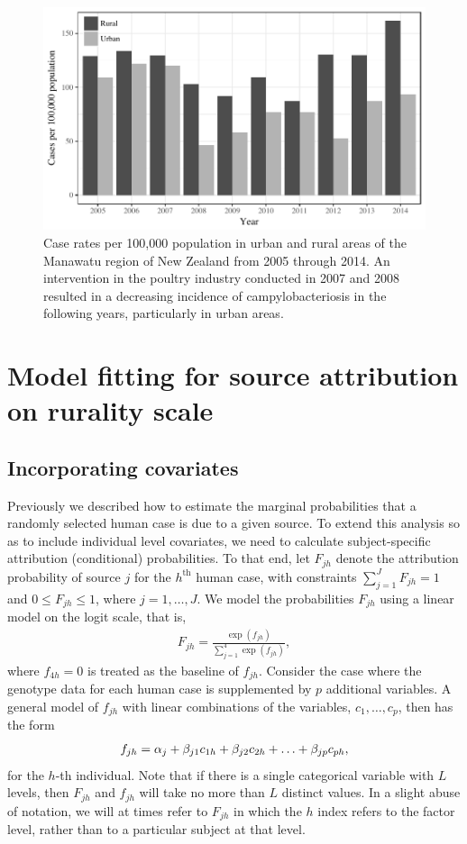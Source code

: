 \documentclass[AMA,STIX1COL]{WileyNJD-v2}
\begin{document}
\begin{figure}
  \centering
  \includegraphics[width=.8\linewidth]{Figures/case_rates}
  \caption{Case rates per 100,000 population in urban and rural areas of the Manawatu region of New Zealand from 2005 through 2014. An intervention in the poultry industry conducted in 2007 and 2008 resulted in a decreasing incidence of campylobacteriosis in the following years, particularly in urban areas.}
  \label{fig:case_rates}
\end{figure}

\section{Model fitting for source attribution on rurality scale}

\subsection{Incorporating covariates}

Previously we described how to estimate the marginal probabilities that a randomly selected human case is due to a given source. To extend this analysis so as to include individual level covariates, we need to calculate subject-specific attribution (conditional) probabilities. To that end, let $F_{jh}$ denote the attribution probability of source $j$ for the $h^\textrm{th}$ human case, with constraints $\sum_{j=1}^J F_{jh} =1$ and $0 \leq F_{jh} \leq 1$, where $j=1, \ldots, J$. We model the probabilities $F_{jh}$ using a linear model on the logit scale, that is,
\begin{align}
  F_{jh}  = \frac{\exp (f_{jh})}{\sum_{j=1}^4 \exp(f_{jh})},
  \label{capF}
\end{align}
where $f_{4h}=0$ is treated as the baseline of $f_{jh}$. Consider the case where the genotype data for each human case is supplemented by $p$ additional variables. A general model of $f_{jh}$ with linear combinations of the variables, $c_1, \ldots, c_p$, then has the form
\begin{align}
f_{jh}  = \alpha_{j} + \beta_{j1} c_{1h} + \beta_{j2} c_{2h} + \ldots + \beta_{jp} c_{ph},  \notag
\end{align}
for the $h$-th individual. Note that if there is a single categorical variable with $L$ levels, then $F_{jh}$ and $f_{jh}$ will take no more than $L$ distinct values. In a slight abuse of notation, we will at times refer to $F_{jh}$ in which the $h$ index refers to the factor level, rather than to a particular subject at that level.
\end{document}
